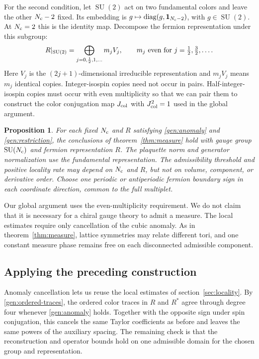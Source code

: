 \documentclass[11pt,a4paper]{article}
\newtheorem{proposition}[theorem]{Proposition}
\theoremstyle{remark}
\DeclareMathOperator{\SU}{SU}
\newcommand{\Id}{\mathbf 1}
\begin{document}
For the second condition, let $\SU(2)$ act on two fundamental colors
and leave the other $N_{\rm c}-2$ fixed. Its embedding is
$g\mapsto\operatorname{diag}(g,\Id_{N_{\rm c}-2})$, with
$g\in\SU(2)$. At $N_{\rm c}=2$ this is the identity map. Decompose
the fermion representation under this subgroup:
\begin{equation}
 R|_{\SU(2)}=\bigoplus_{j=0,\frac12,1,\ldots}m_j V_j,
 \qquad m_j\ \hbox{even for }j=\tfrac12,\tfrac32,\ldots .
 \label{gen:restriction}
\end{equation}
Here $V_j$ is the $(2j+1)$-dimensional irreducible representation and
$m_j V_j$ means $m_j$ identical copies. Integer-isospin copies
need not occur in pairs. Half-integer-isospin copies must occur with even
multiplicity so that we can pair them to construct the color conjugation
map $J_{\rm col}$ with $J_{\rm col}^2=1$ used in the global argument.

\begin{proposition}
\label{gen:measure}
For each fixed $N_{\rm c}$ and $R$ satisfying
\eqref{gen:anomaly} and \eqref{gen:restriction}, the conclusions of
theorem~\ref{thm:measure} hold with gauge group $\SU(N_{\rm c})$ and
fermion representation $R$. The plaquette norm and generator normalization
use the fundamental representation. The admissibility threshold and
positive locality rate may depend on $N_{\rm c}$ and $R$, but not on
volume, component, or derivative order. Choose one periodic or antiperiodic
fermion boundary sign in each coordinate direction, common to the full
multiplet.
\end{proposition}

Our global argument uses the even-multiplicity requirement. We do not
claim that it is necessary for a chiral gauge theory to admit a measure.
The local estimates require only cancellation
of the cubic anomaly. As in theorem~\ref{thm:measure}, lattice symmetries
may relate different tori, and one constant measure phase remains free
on each disconnected admissible component.

\subsection{Applying the preceding construction}

Anomaly cancellation lets us reuse the local estimates of
section~\ref{sec:locality}. By \eqref{gen:ordered-traces}, the ordered
color traces in $R$ and $R^*$ agree through degree four whenever
\eqref{gen:anomaly} holds. Together with the opposite sign under spin
conjugation, this cancels the same Taylor coefficients as before and
leaves the same powers of the auxiliary spacing.
The remaining check is that the reconstruction and operator bounds
hold on one admissible domain for the chosen group and representation.
\end{document}
